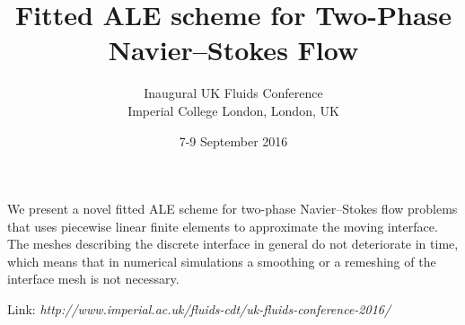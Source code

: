\documentclass{article}
\begin{document}
\title{Fitted ALE scheme for Two-Phase Navier--Stokes Flow}
\date{7-9 September 2016}
\author{Inaugural UK Fluids Conference\\
Imperial College London, London, UK}

\maketitle

We present a novel fitted ALE scheme for two-phase Navier--Stokes flow problems
that uses piecewise linear finite elements to approximate the moving interface.
The meshes describing the discrete interface in general do not deteriorate in
time, which means that in numerical simulations a smoothing or a remeshing of
the interface mesh is not necessary.
\newline

Link: \emph{http://www.imperial.ac.uk/fluids-cdt/uk-fluids-conference-2016/}
\end{document}
